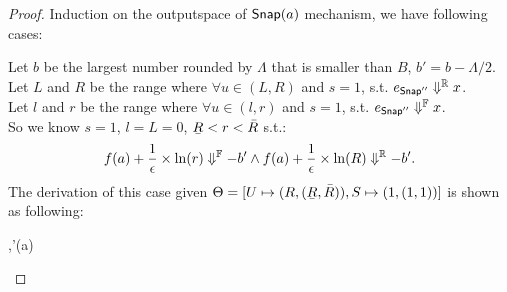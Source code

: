 \documentclass[a4paper,11pt]{article}
\begin{document}
\begin{proof}
%
Induction on the outputspace of $\mathsf{Snap}(a)$ mechanism, we have following cases:
	\begin{itemize}
		Let $b$ be the largest number rounded by $\Lambda$ that is smaller than $B$, $b' = b - \Lambda / 2$.
		\\
		Let $L$ and $R$ be the range where $\forall u \in (L, R)$ and $s = 1$, s.t.
		$e_{\mathsf{Snap}''} \Downarrow^{\mathbb{R}} x$.
		\\
		Let $l$ and $r$ be the range where $\forall u \in (l, r)$ and $s = 1$, s.t.
		$e_{\mathsf{Snap}''} \Downarrow^{\mathbb{F}} x$.
		\\
		So we know $s = 1$, $l = L = 0$, $\ubar{R} < r < \bar{R}$ s.t.:
		$$f(a) + \frac{1}{\epsilon} \times \ln(r) \Downarrow^{\mathbb{F}} -b'
		\land
		f(a) + \frac{1}{\epsilon} \times \ln(R) \Downarrow^{\mathbb{R}} -b'.$$
		The derivation of this case given $\trsenv = [U \mapsto (R, (\ubar{R}, \bar{R})), S \mapsto (1, (1, 1))]$ is shown as following:
		\begin{mathpar}
		{
			{
				{
					{
						\trsenv,\snap'(a)
						\trsto
}}}}
\end{mathpar}
\end{itemize}
\end{proof}
\end{document}
